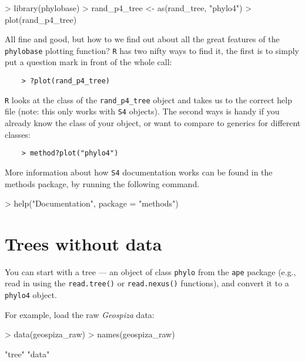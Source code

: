 \documentclass{article}
\newcommand{\code}[1]{{{\tt #1}}}
\begin{document}
\begin{Schunk}
\begin{Sinput}
> library(phylobase)
> rand_p4_tree <- as(rand_tree, "phylo4")
> plot(rand_p4_tree)
\end{Sinput}
\end{Schunk}

All fine and good, but how to we find out about all the great features of the \code{phylobase} plotting function?  \code{R} has two nifty ways to find it, the first is to simply put a question mark in front of the whole call:

\begin{verbatim}
	> ?plot(rand_p4_tree)
\end{verbatim}

\code{R} looks at the class of the \code{rand\_p4\_tree} object and takes us to the correct help file (note: this only works with \code{S4} objects).  The second ways is handy if you already know the class of your object, or want to compare to generics for different classes:

\begin{verbatim}
	> method?plot("phylo4")
\end{verbatim}

More information about how \code{S4} documentation works 
can be found in the methods package, by running the following command.

\begin{Schunk}
\begin{Sinput}
> help("Documentation", package = "methods")
\end{Sinput}
\end{Schunk}

\section{Trees without data}

You can start with a tree --- an object of
class \code{phylo} from the \code{ape} package
(e.g., read in using the \code{read.tree()} or \code{read.nexus()}
functions), and convert it to a \code{phylo4} object.

For example, load the raw \emph{Geospiza} data:
\begin{Schunk}
\begin{Sinput}
> data(geospiza_raw)
> names(geospiza_raw)
\end{Sinput}
\begin{Soutput}
[1] "tree" "data"
\end{Soutput}
\end{Schunk}
\end{document}
